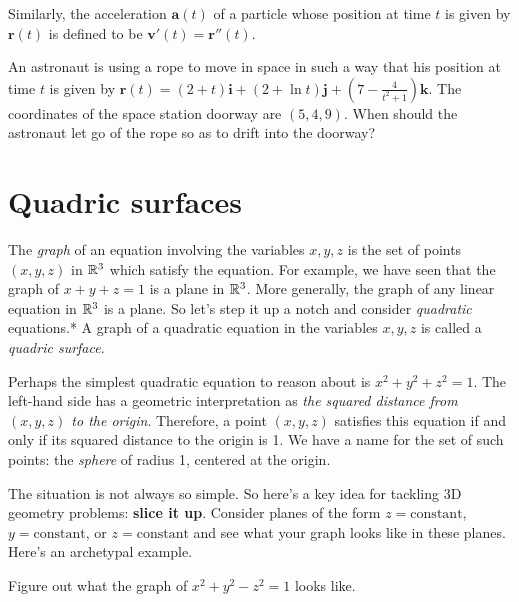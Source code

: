 \documentclass[svgnames]{report}
\begin{document}
Similarly, the acceleration $\mathbf{a}(t)$ of a particle whose
position at time $t$ is given by $\mathbf{r}(t)$ is defined to be
$\mathbf{v}'(t) = \mathbf{r}''(t)$. 

\begin{exercise}{}{}
  An astronaut is using a rope to move in space in such a way that his
  position at time $t$ is given by 
  $\mathbf{r}(t) = (2+t) \mathbf{i} + (2+\ln t) \mathbf{j} + \left( 7
    - \frac{4}{t^2+1}\right) \mathbf{k}$. The coordinates of the space
  station doorway are $(5,4,9)$. When should the astronaut let go of the
  rope so as to drift into the doorway? 
\end{exercise}

\section{Quadric surfaces}

The \textit{graph} of an equation involving the variables $x,y,z$ is
the set of points $(x,y,z)$ in $\mathbb{R}^3$ which satisfy the equation. For
example, we have seen that the graph of $x + y + z = 1$ is a plane in
$\mathbb{R}^3$. More generally, the graph of any linear equation in $\mathbb{R}^3$ is
a plane. So let's step it up a notch and consider \textit{quadratic}
equations.*  A graph of a quadratic
equation in the variables $x,y,z$ is called a \textit{quadric
  surface}. 

Perhaps the simplest quadratic equation to reason about is $x^2 + y^2 + z^2 =
1$. The left-hand side has a geometric interpretation as \textit{the
  squared distance from $(x,y,z)$ to the origin}. Therefore, a point $(x,y,z)$
satisfies this equation if and only if its squared distance to the
origin is 1. We have a name for the set of such points: the
\textit{sphere} of radius 1, centered at the origin.

The situation is not always so simple. So here's a key idea for
tackling 3D geometry problems: \textbf{slice it up}. Consider planes
of the form $z = \mathrm{constant}$, $y = \mathrm{constant}$, or
$z = \mathrm{constant}$ and see what your graph looks like in these
planes. Here's an archetypal example.

\begin{example}{}{}
  Figure out what the graph of $x^2 + y^2 - z^2 = 1$ looks like. 
\end{example}
\end{document}
